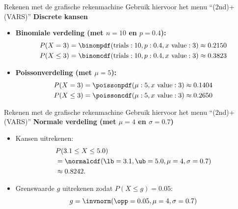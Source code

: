     \begin{frame}{Rekenen met de grafische rekenmachine}
        Gebruik hiervoor het menu \enquote{(2nd)+(VARS)}
        \vfill
        \textbf{Discrete kansen}
        \begin{itemize}\setlength\itemsep{2em}
            \item \textbf{Binomiale verdeling (met $n=10$ en $p=0.4$):}
            \begin{align*}
                P(X = 3)    &= \binompdf(\text{trials}: 10, p: 0.4, \text{$x$ value}: 3) \approx 0.2150 \\
                P(X \leq 3) &= \binomcdf(\text{trials}: 10, p: 0.4, \text{$x$ value}: 3) \approx 0.3823
            \end{align*}
            \item \textbf{Poissonverdeling (met $\mu=5$):}
            \begin{align*}
                P(X = 3)    &= \poissonpdf(\mu: 5, \text{$x$ value}: 3) \approx 0.1404 \\
                P(X \leq 3) &= \poissoncdf(\mu: 5, \text{$x$ value}: 3) \approx 0.2650
            \end{align*}
        \end{itemize}
    \end{frame}

    \begin{frame}{Rekenen met de grafische rekenmachine}
        Gebruik hiervoor het menu \enquote{(2nd)+(VARS)}
        \vfill
        \textbf{Normale verdeling (met $\mu = 4$ en $\sigma = 0.7$)}
        \begin{itemize}\setlength\itemsep{2em}
            \item Kansen uitrekenen:
            \begin{align*}
                &P(3.1 \leq X \leq 5.0) \\
                &= \normalcdf(\lb=3.1, \ub=5.0, \mu=4, \sigma=0.7) \\
                &\approx 0.8242.
            \end{align*}
            \item Grenswaarde $g$ uitrekenen zodat $P(X \leq g) = 0.05$:
            \[
                g = \invnorm(\opp=0.05, \mu=4, \sigma=0.7)
            \]
        \end{itemize}
    \end{frame}

